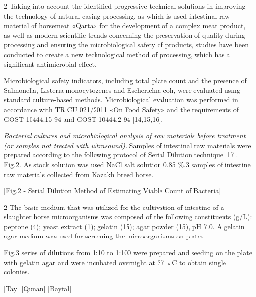 \begin{multicols}{2}
Taking into account the identified progressive technical solutions in
improving the technology of natural casing processing, as which is used
intestinal raw material of horsemeat «Qarta» for the development of a
complex meat product, as well as modern scientific trends concerning the
preservation of quality during processing and ensuring the
microbiological safety of products, studies have been conducted to
create a new technological method of processing, which has a significant
antimicrobial effect.

Microbiological safety indicators, including total plate count and the
presence of Salmonella, Listeria monocytogenes and Escherichia coli,
were evaluated using standard culture-based methods. Microbiological
evaluation was performed in accordance with TR CU 021/2011 «On Food
Safety» and the requirements of GOST 10444.15-94 and GOST 10444.2-94
{[}14,15,16{]}.

\emph{Bacterial cultures and microbiological analysis of raw materials
before treatment (or samples not treated with ultrasound).} Samples of
intestinal raw materials were prepared according to the following
protocol of Serial Dilution technique {[}17{]}. Fig.2. As stock
solution was used NaCl salt solution 0.85 \%.3 samples of intestine raw
materials collected from Kazakh breed horse.
\end{multicols}

[Fig.2 - Serial Dilution Method of Estimating Viable Count of
Bacteria]

\begin{multicols}{2}
The basic medium that was utilized for the cultivation of intestine of a
slaughter horse microorganisms was composed of the following
constituents (g/L): peptone (4); yeast extract (1); gelatin (15); agar
powder (15), pH 7.0. A gelatin agar medium was used for screening the
microorganisms on plates.

Fig.3 series of dilutions from 1:10 to 1:100 were prepared and seeding
on the plate with gelatin agar and were incubated overnight at 37 ◦C to
obtain single colonies.
\end{multicols}

\begin{figs}
[Tay]
[Qunan]
[Baytal]
\end{figs}

